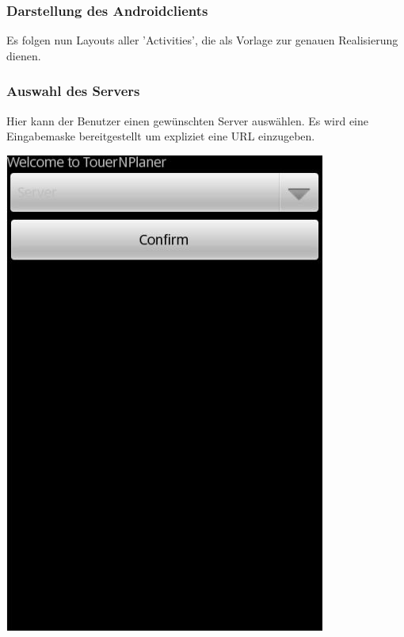 \documentclass[a4paper,10pt,titlepage]{article}
\begin{document}
\subsubsection{Darstellung des Androidclients}
Es folgen nun Layouts aller 'Activities', die als Vorlage zur genauen Realisierung dienen.

\subsubsection{Auswahl des Servers}
Hier kann der Benutzer einen gewünschten Server auswählen. Es wird eine Eingabemaske bereitgestellt um expliziet eine URL einzugeben.
\begin {center}
\includegraphics[scale=0.40]{media/android/server.jpg}
\end {center}
\end{document}
